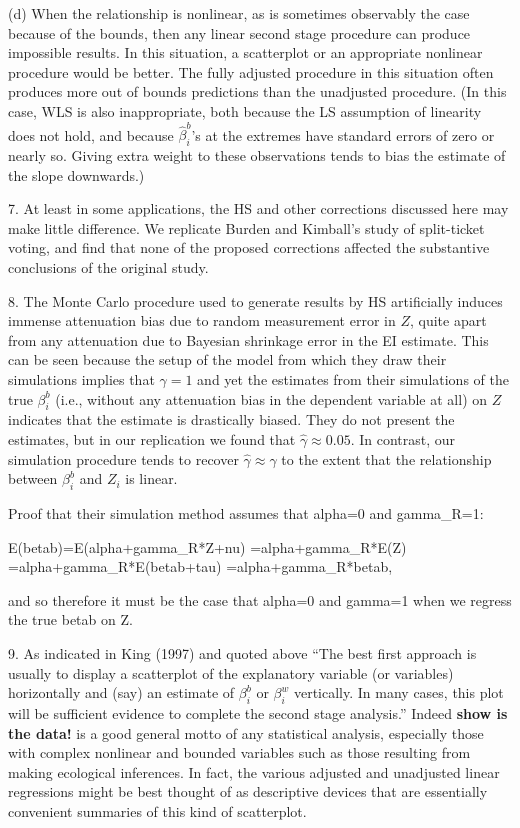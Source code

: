 \documentclass[11pt,titlepage]{article}
\begin{document}
(d) When the relationship is nonlinear, as is sometimes observably the
case because of the bounds, then any linear second stage procedure can
produce impossible results.  In this situation, a scatterplot or an
appropriate nonlinear procedure would be better.  The fully adjusted
procedure in this situation often produces more out of bounds
predictions than the unadjusted procedure.  (In this case, WLS is also
inappropriate, both because the LS assumption of linearity does not
hold, and because $\hat\beta_i^b$'s at the extremes have standard
errors of zero or nearly so.  Giving extra weight to these
observations tends to bias the estimate of the slope downwards.)

7.  At least in some applications, the HS and other corrections
discussed here may make little difference.  We replicate Burden and
Kimball's study of split-ticket voting, and find that none of the
proposed corrections affected the substantive conclusions of the
original study.

8.  The Monte Carlo procedure used to generate results by HS
artificially induces immense attenuation bias due to random
measurement error in $Z$, quite apart from any attenuation due to
Bayesian shrinkage error in the EI estimate.  This can be seen because
the setup of the model from which they draw their simulations implies
that $\gamma=1$ and yet the estimates from their simulations of the
true $\beta_i^b$ (i.e., without any attenuation bias in the dependent
variable at all) on $Z$ indicates that the estimate is drastically
biased. They do not present the estimates, but in our replication we
found that $\hat\gamma\approx 0.05$.  In contrast, our simulation
procedure tends to recover $\hat\gamma\approx\gamma$ to the extent
that the relationship between $\beta_i^b$ and $Z_i$ is linear.

Proof that their simulation method assumes that alpha=0 and gamma_R=1:

E(betab)=E(alpha+gamma_R*Z+nu)
        =alpha+gamma_R*E(Z)
        =alpha+gamma_R*E(betab+tau)
        =alpha+gamma_R*betab,

and so therefore it must be the case that alpha=0 and gamma=1 when we
regress the true betab on Z.

9.  As indicated in King (1997) and quoted above ``The best first
approach is usually to display a scatterplot of the explanatory
variable (or variables) horizontally and (say) an estimate of
$\beta_i^b$ or $\beta_i^w$ vertically.  In many cases, this plot will
be sufficient evidence to complete the second stage analysis.''
Indeed \textbf{show is the data!} is a good general motto of any
statistical analysis, especially those with complex nonlinear and
bounded variables such as those resulting from making ecological
inferences.  In fact, the various adjusted and unadjusted linear
regressions might be best thought of as descriptive devices that are
essentially convenient summaries of this kind of scatterplot.
\end{document}
